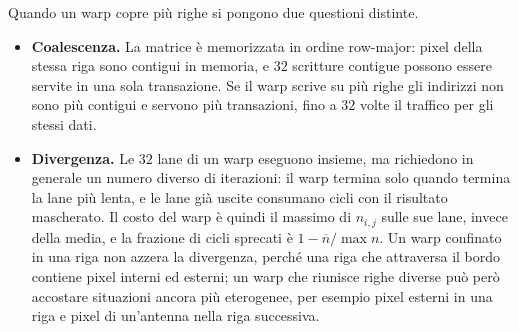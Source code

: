 Quando un warp copre più righe si pongono due questioni distinte.
\begin{itemize}
    \item \textbf{Coalescenza.} La matrice è memorizzata in ordine row-major:
    pixel della stessa riga sono contigui in memoria, e $32$ scritture contigue
    possono essere servite in una sola transazione. Se il warp scrive su più
    righe gli indirizzi non sono più contigui e servono più transazioni, fino a
    $32$ volte il traffico per gli stessi dati.
    \item \textbf{Divergenza.} Le $32$ lane di un warp eseguono insieme, ma
    richiedono in generale un numero diverso di iterazioni: il warp termina solo
    quando termina la lane più lenta, e le lane già uscite consumano cicli con il
    risultato mascherato. Il costo del warp è quindi il massimo di $n_{i,j}$ sulle
    sue lane, invece della media, e la frazione di cicli sprecati è
    $1 - \overline{n}/\max n$. Un warp confinato in una riga non azzera la
    divergenza, perché una riga che attraversa il bordo contiene pixel interni ed
    esterni; un warp che riunisce righe diverse può però accostare situazioni
    ancora più eterogenee, per esempio pixel esterni in una riga e pixel di
    un'antenna nella riga successiva.
\end{itemize}
\vspace{3mm}
